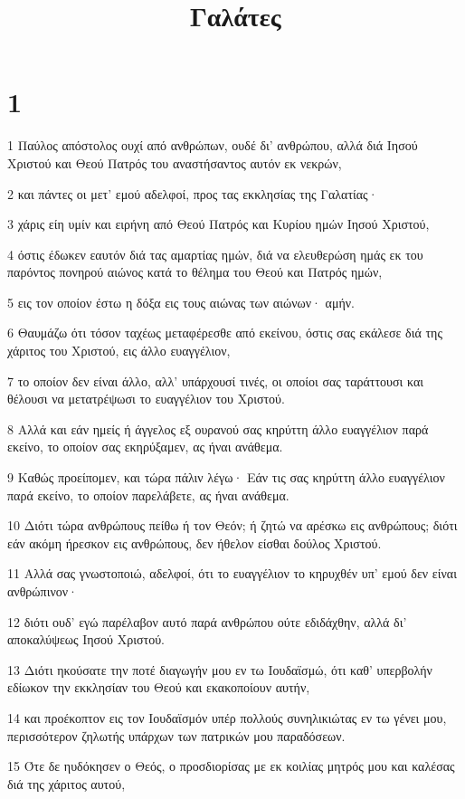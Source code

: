 

\title{Γαλάτες}


\chapter{1}

\par 1 Παύλος απόστολος ουχί από ανθρώπων, ουδέ δι' ανθρώπου, αλλά διά Ιησού Χριστού και Θεού Πατρός του αναστήσαντος αυτόν εκ νεκρών,
\par 2 και πάντες οι μετ' εμού αδελφοί, προς τας εκκλησίας της Γαλατίας·
\par 3 χάρις είη υμίν και ειρήνη από Θεού Πατρός και Κυρίου ημών Ιησού Χριστού,
\par 4 όστις έδωκεν εαυτόν διά τας αμαρτίας ημών, διά να ελευθερώση ημάς εκ του παρόντος πονηρού αιώνος κατά το θέλημα του Θεού και Πατρός ημών,
\par 5 εις τον οποίον έστω η δόξα εις τους αιώνας των αιώνων· αμήν.
\par 6 Θαυμάζω ότι τόσον ταχέως μεταφέρεσθε από εκείνου, όστις σας εκάλεσε διά της χάριτος του Χριστού, εις άλλο ευαγγέλιον,
\par 7 το οποίον δεν είναι άλλο, αλλ' υπάρχουσί τινές, οι οποίοι σας ταράττουσι και θέλουσι να μετατρέψωσι το ευαγγέλιον του Χριστού.
\par 8 Αλλά και εάν ημείς ή άγγελος εξ ουρανού σας κηρύττη άλλο ευαγγέλιον παρά εκείνο, το οποίον σας εκηρύξαμεν, ας ήναι ανάθεμα.
\par 9 Καθώς προείπομεν, και τώρα πάλιν λέγω· Εάν τις σας κηρύττη άλλο ευαγγέλιον παρά εκείνο, το οποίον παρελάβετε, ας ήναι ανάθεμα.
\par 10 Διότι τώρα ανθρώπους πείθω ή τον Θεόν; ή ζητώ να αρέσκω εις ανθρώπους; διότι εάν ακόμη ήρεσκον εις ανθρώπους, δεν ήθελον είσθαι δούλος Χριστού.
\par 11 Αλλά σας γνωστοποιώ, αδελφοί, ότι το ευαγγέλιον το κηρυχθέν υπ' εμού δεν είναι ανθρώπινον·
\par 12 διότι ουδ' εγώ παρέλαβον αυτό παρά ανθρώπου ούτε εδιδάχθην, αλλά δι' αποκαλύψεως Ιησού Χριστού.
\par 13 Διότι ηκούσατε την ποτέ διαγωγήν μου εν τω Ιουδαϊσμώ, ότι καθ' υπερβολήν εδίωκον την εκκλησίαν του Θεού και εκακοποίουν αυτήν,
\par 14 και προέκοπτον εις τον Ιουδαϊσμόν υπέρ πολλούς συνηλικιώτας εν τω γένει μου, περισσότερον ζηλωτής υπάρχων των πατρικών μου παραδόσεων.
\par 15 Ότε δε ηυδόκησεν ο Θεός, ο προσδιορίσας με εκ κοιλίας μητρός μου και καλέσας διά της χάριτος αυτού,
